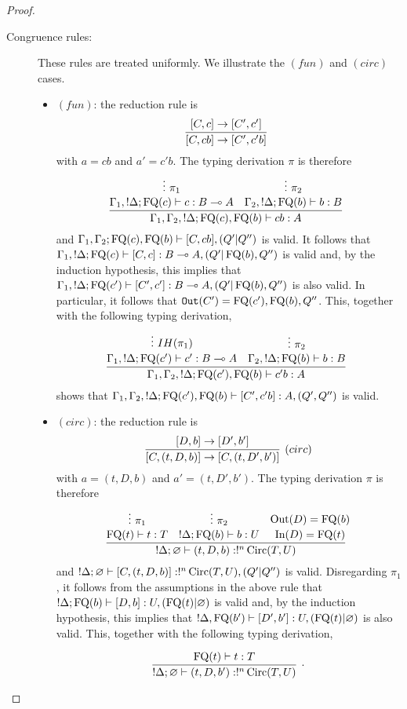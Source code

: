 \documentclass[twoside]{article}
\begin{document}
\begin{proof}
\begin{description}
\item[Congruence rules:] These rules are treated uniformly. We illustrate the 
$(fun)$ and $(circ)$ cases.
\begin{itemize}
  \item $(fun)$: the reduction rule is
  \[
    \infer[]{[C,cb]\to[C',c'b]}{
      [C,c]\to[C',c']
    }
  \]
  with $a=cb$ and $a'=c'b$. The typing derivation $\pi$ is therefore
  \[
    \infer[]{\Gamma_1,\Gamma_2, !\Delta;\FQ(c),\FQ(b)\entails cb:A}{
      \deduce[]{\Gamma_1, !\Delta;\FQ(c)\entails c:B\loli A}{
        \vdots~\pi_1
      } 
      &
      \deduce[]{\Gamma_2, !\Delta ;\FQ(b)\entails b:B}{
        \vdots~\pi_2
      } 
    }
  \]
  and $\Gamma_1,\Gamma_2;\mathop{\textrm{FQ}}\nolimits(c),\mathop{\textrm{FQ}}\nolimits(b)\vdash [C, cb],(Q'|Q'')$ is valid.
  It follows that $\Gamma_1, !\Delta;\mathop{\textrm{FQ}}\nolimits(c)\vdash [C,c]:B\multimap A,(Q'|\mathop{\textrm{FQ}}\nolimits(b),Q'')$ 
  is valid and, by the induction hypothesis, this implies that 
  $\Gamma_1, !\Delta;\mathop{\textrm{FQ}}\nolimits(c')\vdash [C',c']:B\multimap A,(Q'|\mathop{\textrm{FQ}}\nolimits(b),Q'')$ is also valid.
  In particular, it follows that $\mathtt{Out}(C')=\mathop{\textrm{FQ}}\nolimits(c'),\mathop{\textrm{FQ}}\nolimits(b),Q''$. This, 
  together with the following typing derivation,
  \[
    \infer[]{\Gamma_1,\Gamma_2, !\Delta;\FQ(c'),\FQ(b)\entails c'b:A}{
      \deduce[]{\Gamma_1, !\Delta;\FQ(c')\entails c':B\loli A}{
        \vdots~IH(\pi_1)
      } 
      &
      \deduce[]{\Gamma_2, !\Delta ;\FQ(b)\entails b:B}{
        \vdots~\pi_2
      } 
    }
  \]  
  shows that $\Gamma_1,\Gamma_2, !\Delta;\mathop{\textrm{FQ}}\nolimits(c'),\mathop{\textrm{FQ}}\nolimits(b)\vdash [C',c'b]:A,(Q',Q'')$ 
  is valid.
  \item $(circ)$: the reduction rule is
  \[
    \infer[(circ)]{[C, (t,D,b)]\to [C, (t,D',b')]}{
      [D,b]\to [D',b']
    }
  \]  
  with $a=(t,D,b)$ and $a'=(t,D',b')$. The typing derivation $\pi$ is therefore
  \[
  \infer[]{!\Delta;\varnothing\entails (t,D,b):!^n\Circ(T,U)}{
    \deduce[]{\FQ(t)\entails t:T}{
      \vdots~\pi_1
    } 
    &
    \deduce[]{!\Delta ; \FQ(b)\entails b:U}{
      \vdots~\pi_2
    }
    &
    \deduce[]{\In(D)=\FQ(t)}{
      \Out(D)=\FQ(b)
    }
  }
  \]  
  and $!\Delta ; \varnothing \vdash [C,(t,D,b)]:!^n\mathop{\textrm{Circ}}\nolimits(T,U),(Q'|Q'')$ is valid. 
  Disregarding $\pi_1$, it follows from the assumptions in the above rule 
  that $!\Delta ; \mathop{\textrm{FQ}}\nolimits(b)\vdash [D,b]:U, (\mathop{\textrm{FQ}}\nolimits(t)|\varnothing)$ is valid and, 
  by the induction hypothesis, this implies that 
  $!\Delta,\mathop{\textrm{FQ}}\nolimits(b')\vdash [D',b']:U,(\mathop{\textrm{FQ}}\nolimits(t)|\varnothing)$ is also valid.
  This, together with the following typing derivation,
  \[
  \infer[.]{!\Delta;\varnothing\entails (t,D,b'):!^n\Circ(T,U)}{
    \deduce[]{\FQ(t)\entails t:T}{
}}\]
\end{itemize}
\end{description}
\end{proof}
\end{document}
